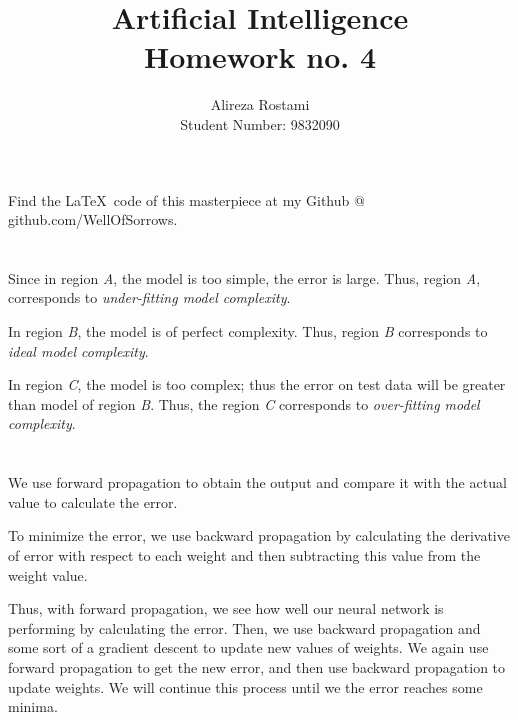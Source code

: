\documentclass{article}
\title{Artificial Intelligence\\Homework no. 4}
\author{Alireza Rostami\\Student Number: 9832090}
\date{}
\begin{document}
    \maketitle
    \begin{center}
        Find the \LaTeX \ code of this masterpiece at my Github @ github.com/WellOfSorrows.
    \end{center}
    \section{}
    Since in region \textit{A}, the model is too simple, the error is large. Thus, region \textit{A}, corresponds to \textit{under-fitting model complexity}. \par
    In region \textit{B}, the model is of perfect complexity. Thus, region \textit{B} corresponds to \textit{ideal model complexity}. \par
    In region \textit{C}, the model is too complex; thus the error on test data will be greater than model of region \textit{B}. Thus, the region \textit{C} corresponds to \textit{over-fitting model complexity}.
    \section{}
    We use forward propagation to obtain the output and compare it with the actual value to calculate the error.
    
    To minimize the error, we use backward propagation by calculating the derivative of error with respect to each weight and then subtracting this value from the weight value.

    Thus, with forward propagation, we see how well our neural network is performing by calculating the error. Then, we use backward propagation and some sort of a gradient descent to update new values of weights. We again use forward propagation to get the new error, and then use backward propagation to update weights. We will continue this process until we the error reaches some minima.
\end{document}

